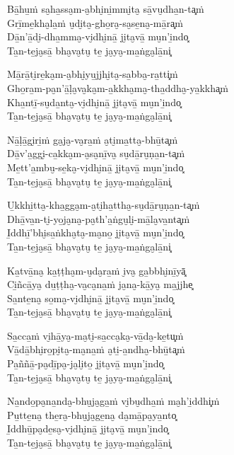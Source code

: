 
\begin{paritta}
Bā̱hu̱ṁ sa̮ha̱ssa̮m-a̮bhi̮ni̱mmi̮ta̮ sā̱vu̮dha̱n-ta͓ṁ\\
Grī̱me̱kha̮la̱ṁ u̮di̮ta̮-gho̱ra̮-sa̮se̱na̮-mā̱ra͓ṁ\\
Dā̱n'ā̱di̮-dha̱mma̮-vi̮dhi̮nā̱ ji̮ta̮vā̱ mu̮n'i̱ndo͓\\
Ta̱n-te̱ja̮sā̱ bha̮va̮tu̮ te̱ ja̮ya̮-ma̱ṅga̮lā̱ni͓

Mā̱rā̱ti̮re̱ka̮m-a̮bhi̮yu̱jjhi̮ta̮-sa̱bba̮-ra̱tti͓ṁ\\
Gho̱ra̱m-pa̮n'ā̱ḷa̮va̮ka̮m-a̱kkha̮ma̮-tha̱ddha̮-ya̱kkha͓ṁ\\
Kha̱ntī̱-su̮da̱nta̮-vi̮dhi̮nā̱ ji̮ta̮vā̱ mu̮n'i̱ndo͓\\
Ta̱n-te̱ja̮sā̱ bha̮va̮tu̮ te̱ ja̮ya̮-ma̱ṅga̮lā̱ni͓

Nā̱ḷā̱gi̮ri̱ṁ ga̮ja̮-va̮ra̱ṁ a̮ti̮ma̱tta̮-bhū̱ta͓ṁ\\
Dā̱v'a̱ggi̮-ca̱kka̮m-a̮sa̮nī̱va̮ su̮dā̱ru̮ṇa̱n-ta͓ṁ\\
Me̱tt'a̱mbu̮-se̱ka̮-vi̮dhi̮nā̱ ji̮ta̮vā̱ mu̮n'i̱ndo͓\\
Ta̱n-te̱ja̮sā̱ bha̮va̮tu̮ te̱ ja̮ya̮-ma̱ṅga̮lā̱ni͓

U̱kkhi̱tta̮-kha̱gga̮m-a̮ti̮ha̱ttha̮-su̮dā̱ru̮ṇa̱n-ta͓ṁ\\
Dhā̱va̱n-ti̮-yo̱ja̮na̮-pa̮th'a̱ṅgu̮li̮-mā̱la̮va̱nta͓ṁ\\
I̱ddhī̱'bhi̮sa̱ṅkha̮ta̮-ma̮no̱ ji̮ta̮vā̱ mu̮n'i̱ndo͓\\
Ta̱n-te̱ja̮sā̱ bha̮va̮tu̮ te̱ ja̮ya̮-ma̱ṅga̮lā̱ni͓

Ka̱tvā̱na̮ ka̱ṭṭha̮m-u̮da̮ra̱ṁ i̮va̮ ga̱bbhi̮nī̱yā͓\\
Ci̱ñcā̱ya̮ du̱ṭṭha̮-va̮ca̮na̱ṁ ja̮na̮-kā̱ya̮ ma̱jjhe͓\\
Sa̱nte̱na̮ so̱ma̮-vi̮dhi̮nā̱ ji̮ta̮vā̱ mu̮n'i̱ndo͓\\
Ta̱n-te̱ja̮sā̱ bha̮va̮tu̮ te̱ ja̮ya̮-ma̱ṅga̮lā̱ni͓

Sa̱cca̱ṁ vi̮hā̱ya̮-ma̮ti̮-sa̱cca̮ka̮-vā̱da̮-ke̱tu͓ṁ\\
Vā̱dā̱bhi̮ro̱pi̮ta̮-ma̮na̱ṁ a̮ti̱-a̱ndha̮-bhū̱ta͓ṁ\\
Pa̱ññā̱-pa̮dī̱pa̮-ja̮li̮to̱ ji̮ta̮vā̱ mu̮n'i̱ndo͓\\
Ta̱n-te̱ja̮sā̱ bha̮va̮tu̮ te̱ ja̮ya̮-ma̱ṅga̮lā̱ni͓

Na̱ndo̱pa̮na̱nda̮-bhu̮ja̮ga̱ṁ vi̮bu̮dha̱ṁ ma̮h'i̱ddhi͓ṁ\\
Pu̱tte̱na̮ the̱ra̮-bhu̮ja̮ge̱na̮ da̮mā̱pa̮ya̱nto͓\\
I̱ddhū̱pa̮de̱sa̮-vi̮dhi̮nā̱ ji̮ta̮vā̱ mu̮n'i̱ndo͓\\
Ta̱n-te̱ja̮sā̱ bha̮va̮tu̮ te̱ ja̮ya̮-ma̱ṅga̮lā̱ni͓


\end{paritta}
